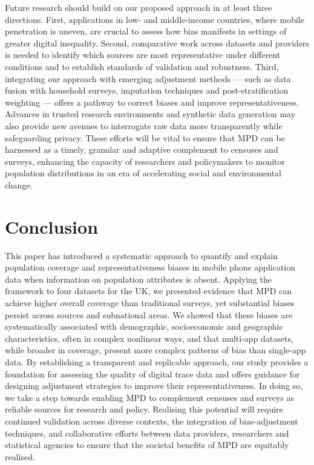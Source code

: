 \documentclass[]{rsos}%
\begin{document}
Future research should build on our proposed approach in at least three
directions. First, applications in low- and middle-income countries,
where mobile penetration is uneven, are crucial to assess how bias
manifests in settings of greater digital inequality. Second, comparative
work across datasets and providers is needed to identify which sources
are most representative under different conditions and to establish
standards of validation and robustness. Third, integrating our approach
with emerging adjustment methods --- such as data fusion with household
surveys, imputation techniques and post-stratification weighting ---
offers a pathway to correct biases and improve representativeness.
Advances in trusted research environments and synthetic data generation
may also provide new avenues to interrogate raw data more transparently
while safeguarding privacy. These efforts will be vital to ensure that
MPD can be harnessed as a timely, granular and adaptive complement to
censuses and surveys, enhancing the capacity of researchers and
policymakers to monitor population distributions in an era of
accelerating social and environmental change.

\section{Conclusion}\label{conclusion}

This paper has introduced a systematic approach to quantify and explain
population coverage and representativeness biases in mobile phone
application data when information on population attributes is absent.
Applying the framework to four datasets for the UK, we presented
evidence that MPD can achieve higher overall coverage than traditional
surveys, yet substantial biases persist across sources and subnational
areas. We showed that these biases are systematically associated with
demographic, socioeconomic and geographic characteristics, often in
complex nonlinear ways, and that multi-app datasets, while broader in
coverage, present more complex patterns of bias than single-app data. By
establishing a transparent and replicable approach, our study provides a
foundation for assessing the quality of digital trace data and offers
guidance for designing adjustment strategies to improve their
representativeness. In doing so, we take a step towards enabling MPD to
complement censuses and surveys as reliable sources for research and
policy. Realising this potential will require continued validation
across diverse contexts, the integration of bias-adjustment techniques,
and collaborative efforts between data providers, researchers and
statistical agencies to ensure that the societal benefits of MPD are
equitably realised.
\end{document}
